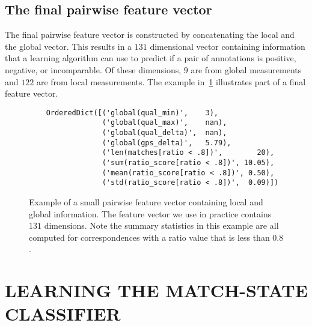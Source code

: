
\FloatBarrier{}
\subsection{The final pairwise feature vector}

The final pairwise feature vector is constructed by concatenating the local and the global vector.
This results in a $131$ dimensional vector containing information that a learning algorithm can use to predict if
  a pair of annotations is positive, negative, or incomparable.
Of these dimensions, $9$ are from global measurements and $122$ are from local measurements.
The example in~\cref{fig:PairFeatVec} illustrates part of a final feature vector.

\begin{figure}
\begin{verbatim}
    OrderedDict([('global(qual_min)',    3),
                 ('global(qual_max)',    nan),
                 ('global(qual_delta)',  nan),
                 ('global(gps_delta)',   5.79),
                 ('len(matches[ratio < .8])',        20),
                 ('sum(ratio_score[ratio < .8])', 10.05),
                 ('mean(ratio_score[ratio < .8])', 0.50),
                 ('std(ratio_score[ratio < .8])',  0.09)])
\end{verbatim}
\caption[A pairwise feature vector]{ %
Example of a small pairwise feature vector containing local and global information.
The feature vector we use in practice contains $131$ dimensions.
Note the summary statistics in this example are all computed for correspondences with a ratio value that is less
  than $0.8$.
}
\label{fig:PairFeatVec}
\end{figure}


\section{LEARNING THE MATCH-STATE CLASSIFIER}\label{sec:learnclf}

